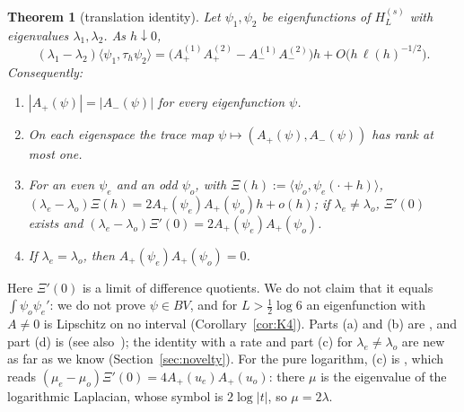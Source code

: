 \documentclass[11pt]{amsart}
\newtheorem{theorem}{Theorem}[section]
\theoremstyle{definition}
\theoremstyle{remark}
\numberwithin{equation}{section}
\begin{document}
\begin{theorem}[translation identity]\label{thm:transl}
Let $\psi_1,\psi_2$ be eigenfunctions of $H^{(s)}_L$ with eigenvalues $\lambda_1,\lambda_2$. As $h\downarrow0$,
\[
(\lambda_1-\lambda_2)\langle\psi_1,\tau_h\psi_2\rangle=\bigl(A_+^{(1)}A_+^{(2)}-A_-^{(1)}A_-^{(2)}\bigr)h+O\bigl(h\,\ell(h)^{-1/2}\bigr).
\]
Consequently:
\begin{enumerate}
\item[(a)] $|A_+(\psi)|=|A_-(\psi)|$ for every eigenfunction $\psi$.
\item[(b)] On each eigenspace the trace map $\psi\mapsto(A_+(\psi),A_-(\psi))$ has rank at most one.
\item[(c)] For an even $\psi_e$ and an odd $\psi_o$, with $\Xi(h):=\langle\psi_o,\psi_e(\cdot+h)\rangle$, $(\lambda_e-\lambda_o)\Xi(h)=2A_+(\psi_e)A_+(\psi_o)h+o(h)$; if $\lambda_e\ne\lambda_o$, $\Xi'(0)$ exists and $(\lambda_e-\lambda_o)\Xi'(0)=2A_+(\psi_e)A_+(\psi_o)$.
\item[(d)] If $\lambda_e=\lambda_o$, then $A_+(\psi_e)A_+(\psi_o)=0$.
\end{enumerate}
\end{theorem}

Here $\Xi'(0)$ is a limit of difference quotients. We do not claim that it equals $\int\psi_o\psi_e'$: we do not prove $\psi\in BV$, and for $L>\frac12\log6$ an eigenfunction with $A\ne0$ is Lipschitz on no interval (Corollary~\ref{cor:K4}). Parts (a) and (b) are \cite[(2.5)]{BT26}, and part (d) is \cite[(6.3)]{BT26} (see also~\cite{SoDa}); the identity with a rate and part (c) for $\lambda_e\ne\lambda_o$ are new as far as we know (Section~\ref{sec:novelty}). For the pure logarithm, (c) is \cite[Cor.~1.5]{BPL}, which reads $(\mu_e-\mu_o)\Xi'(0)=4A_+(u_e)A_+(u_o)$: there $\mu$ is the eigenvalue of the logarithmic Laplacian, whose symbol is $2\log|t|$, so $\mu=2\lambda$.
\end{document}
